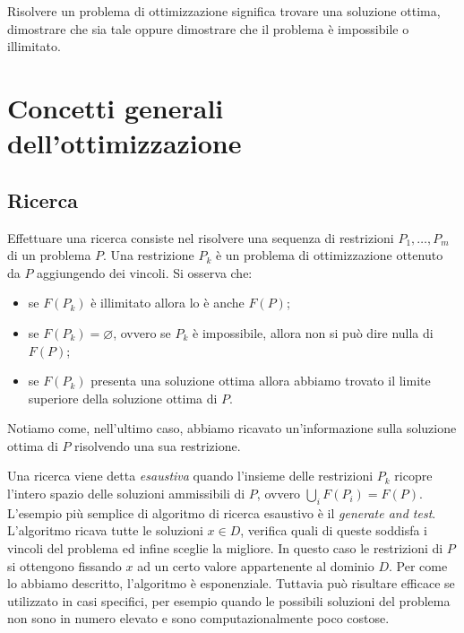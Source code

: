 Risolvere un problema di ottimizzazione significa trovare una soluzione
ottima, dimostrare che sia tale oppure dimostrare che il problema è impossibile
o illimitato.

\section{Concetti generali dell'ottimizzazione}%
\label{sec:Concetti generali dell'ottimizzazione}

\subsection{Ricerca}%
\label{sub:Ricerca (search)}
Effettuare una ricerca consiste nel risolvere una sequenza 
di restrizioni $P_1, \ldots, P_m$ di un problema $P$. 
Una restrizione $P_k$ è un problema di ottimizzazione ottenuto da $P$ aggiungendo
dei vincoli.
Si osserva che:
\begin{itemize}
    \item se $F(P_k)$ è illimitato allora lo è anche $F(P)$;
    \item se $F(P_k) = \varnothing$, ovvero se $P_k$ è impossibile,
        allora non si può dire nulla di $F(P)$;
    \item se $F(P_k)$ presenta una soluzione ottima allora abbiamo trovato
        il limite superiore della soluzione ottima di $P$.
\end{itemize}
Notiamo come, nell'ultimo caso, abbiamo ricavato un'informazione sulla soluzione
ottima di $P$ risolvendo una sua restrizione.


Una ricerca viene detta \textit{esaustiva} quando l'insieme delle restrizioni
$P_k$ ricopre l'intero spazio delle soluzioni ammissibili di $P$, ovvero 
$\bigcup_i F(P_i) = F(P)$.
L'esempio più semplice di algoritmo di ricerca esaustivo è il \textit{generate
and test}.
L'algoritmo ricava tutte le soluzioni $x \in D$, verifica quali di queste
soddisfa i vincoli del problema ed infine sceglie la migliore.
In questo caso le restrizioni di $P$ si ottengono fissando
$x$ ad un certo valore appartenente al dominio $D$.
Per come lo abbiamo descritto, l'algoritmo è esponenziale.
Tuttavia può risultare efficace se utilizzato in casi specifici,
per esempio quando le possibili soluzioni del problema non sono 
in numero elevato e sono computazionalmente poco costose.

